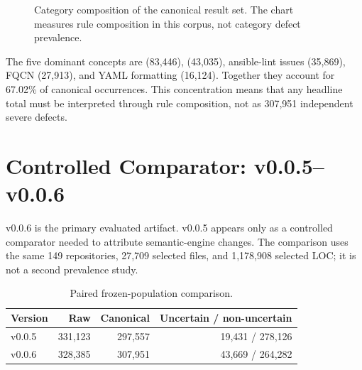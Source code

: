 \begin{figure}[H]
\centering
{}
\caption{Category composition of the canonical result set. The chart measures
rule composition in this corpus, not category defect prevalence.}
\label{fig:category_results}
\end{figure}

The five dominant concepts are  (83,446),
 (43,035), ansible-lint issues (35,869), FQCN
(27,913), and YAML formatting (16,124). Together they account for 67.02\% of
canonical occurrences. This concentration means that any headline total must
be interpreted through rule composition, not as 307,951 independent severe
defects.

\section{Controlled Comparator: v0.0.5--v0.0.6}
v0.0.6 is the primary evaluated artifact. v0.0.5 appears only as a controlled
comparator needed to attribute semantic-engine changes. The comparison uses
the same 149 repositories, 27,709 selected files, and 1,178,908 selected LOC;
it is not a second prevalence study.
\begin{table}[H]
\centering
\caption{Paired frozen-population comparison.}
\begin{tabular}{lrrr}
\toprule
Version & Raw & Canonical & Uncertain / non-uncertain \\
\midrule
v0.0.5 & 331,123 & 297,557 & 19,431 / 278,126 \\
v0.0.6 & 328,385 & 307,951 & 43,669 / 264,282 \\
\bottomrule
\end{tabular}
\end{table}

